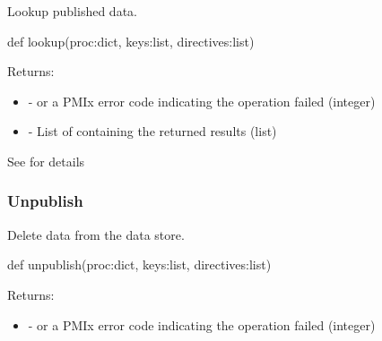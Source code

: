 \summary

Lookup published data.

\format

\pyspecificstart
\begin{codepar}
def lookup(proc:dict, keys:list, directives:list)
\end{codepar}
\pyspecificend

\begin{arglist}
\end{arglist}

Returns:
\begin{itemize}
    \item {} -  or a \ac{PMIx} error code indicating the operation failed (integer)
    \item {} - List of  containing the returned results (list)
\end{itemize}

See  for details


\subsubsection{Unpublish}

\summary

Delete data from the data store.

\format

\pyspecificstart
\begin{codepar}
def unpublish(proc:dict, keys:list, directives:list)
\end{codepar}
\pyspecificend

\begin{arglist}
\end{arglist}

Returns:
\begin{itemize}
    \item {} -  or a \ac{PMIx} error code indicating the operation failed (integer)
\end{itemize}

